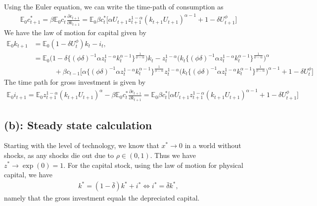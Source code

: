 \documentclass[a4paper]{article}
\theoremstyle{definition}
\begin{document}
Using the Euler equation, we can write the time-path of consumption as
	\begin{align*}
	\mathbb E_0 c_{t+1}^* = \beta \mathbb E_0 {c_{t}^*} \frac{\partial c_{t+1}}{\partial k_{t+1}} = \mathbb E_0\beta {c_t^*} \Big[ \alpha U_{t+1} z_{t+1}^{1-\alpha} (k_{t+1}U_{t+1})^{\alpha-1}+1-\delta U_{t+1}^\phi \Big]
	\end{align*}
We have the law of motion for capital given by
	\begin{align*}
	\mathbb E_0 k_{t+1} 	&= \mathbb E_0 (1-\delta U_t^\phi)k_t - i_t, \\
				&=\mathbb E_0 \Big(1-\delta \Big\{ (\phi \delta)^{-1}  \alpha z_t^{1-\alpha} k_t^{\alpha-1} \Big\}^{\frac{1}{\phi-\alpha}} \Big)k_t -  z_t^{1-\alpha}\Big(k_t \Big\{ (\phi \delta)^{-1}  \alpha z_t^{1-\alpha} k_t^{\alpha-1} \Big\}^{\frac{1}{\phi-\alpha}} \Big)^\alpha  \\
				&\quad\quad\quad + \beta {c_{t-1}}\Big[ \alpha \Big\{ (\phi \delta)^{-1}  \alpha z_t^{1-\alpha} k_t^{\alpha-1} \Big\}^{\frac{1}{\phi-\alpha}} z_t^{1-\alpha}\Big(k_t \Big\{ (\phi \delta)^{-1}  \alpha z_t^{1-\alpha} k_t^{\alpha-1} \Big\}^{\frac{1}{\phi-\alpha}} \Big)^{\alpha-1}+1-\delta U_t^\phi \Big]
	\end{align*}	
The time path for gross investment is given by
	\begin{align*}
	\mathbb E_0i_{t+1} = \mathbb E_0 z_{t+1}^{1-\alpha}(k_{t+1} U_{t+1})^\alpha - \beta \mathbb E_0 {c_{t}^*} \frac{\partial c_{t+1}}{\partial k_{t+1}} =\mathbb E_0 \beta {c_t^*} \Big[ \alpha U_{t+1} z_{t+1}^{1-\alpha} (k_{t+1}U_{t+1})^{\alpha-1}+1-\delta U_{t+1}^\phi \Big]
	\end{align*}	


\subsection{(b): Steady state calculation}
Starting with the level of technology, we know that $x^* \rightarrow 0$ in a world without shocks, as any shocks die out due to $\rho \in (0,1)$. Thus we have $z^* \rightarrow \exp(0) = 1$. For the capital stock, using the law of motion for physical capital, we have
	\begin{align*}
	k^* = (1-\bar \delta)k^* + i^* \Leftrightarrow i^* = \bar\delta k^*,
	\end{align*}
namely that the gross investment equals the depreciated capital.	
\end{document}
